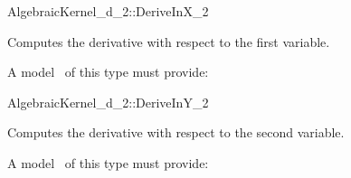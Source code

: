 \begin{ccRefConcept}{AlgebraicKernel_d_2::DeriveInX_2}

\ccDefinition
Computes the derivative with respect to the first variable.


A model \ccVar\ of this type must provide:

{}

\end{ccRefConcept}
\begin{ccRefConcept}{AlgebraicKernel_d_2::DeriveInY_2}

\ccDefinition
Computes the derivative with respect to the second variable.


A model \ccVar\ of this type must provide:

{}

\end{ccRefConcept}
